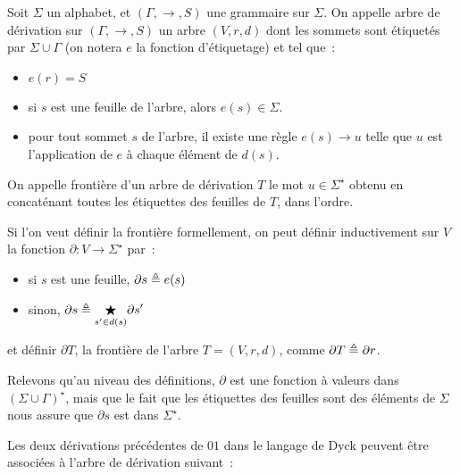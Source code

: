 \begin{definition}
  Soit $\Sigma$ un alphabet, et $(\Gamma,\to,S)$ une grammaire sur $\Sigma$.
  On appelle arbre de dérivation sur $(\Gamma,\to,S)$ un arbre $(V,r,d)$ dont
  les sommets sont étiquetés par $\Sigma\cup\Gamma$ (on notera $e$ la fonction
  d'étiquetage) et tel que~:
  \begin{itemize}
  \item $e(r) = S$
  \item si $s$ est une feuille de l'arbre, alors $e(s) \in \Sigma$.
  \item pour tout sommet $s$ de l'arbre, il existe une règle $e(s) \to u$ telle
    que $u$ est l'application de $e$ à chaque élément de $d(s)$.
  \end{itemize}

  On appelle frontière d'un arbre de dérivation $T$ le mot
  $u \in \Sigma^\star$ obtenu en concaténant toutes les étiquettes
  des feuilles de $T$, dans l'ordre.
\end{definition}

\begin{remark}
  Si l'on veut définir la frontière formellement, on peut définir inductivement
  sur $V$ la fonction $\partial : V \to \Sigma^\star$ par~:
  \begin{itemize}
  \item si $s$ est une feuille, $\partial s \triangleq e(s)$
  \item sinon,
    $\displaystyle\partial s \triangleq \underset{{s' \in d(s)}}{\bigstar}
    \partial s'$
  \end{itemize}
  et définir $\partial T$, la frontière de l'arbre $T = (V,r,d)$, comme
  $\partial T \triangleq \partial r$.

  Relevons qu'au niveau des définitions, $\partial$ est une fonction à valeurs
  dans $(\Sigma\cup\Gamma)^\star$, mais que le fait que les étiquettes des
  feuilles sont des éléments de $\Sigma$ nous assure que $\partial s$ est
  dans $\Sigma^\star$.
\end{remark}

\begin{example}
  Les deux dérivations précédentes de $01$ dans le langage de Dyck peuvent être
  associées à l'arbre de dérivation suivant~:
  \begin{figure}[h]
  \centering
\end{figure}
\end{example}

